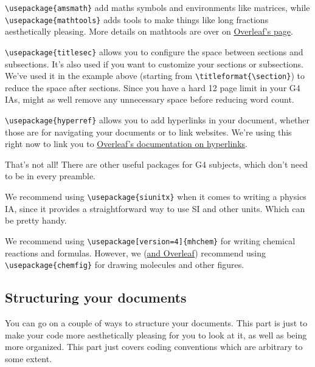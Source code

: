 \verb|\usepackage{amsmath}| add maths symbols and environments like matrices,
while\\ \verb|\usepackage{mathtools}| adds tools to make things like long fractions aesthetically pleasing.
More details on mathtools are over on
\href{https://www.overleaf.com/learn/latex/Articles/Mathtools_-_for_beautiful_math}{Overleaf's page}.

\verb|\usepackage{titlesec}| allows you to configure the space between sections and subsections.
It's also used if you want to customize your sections or subsections.
We've used it in the example above (starting from \verb|\titleformat{\section}|)
to reduce the space after sections.
Since you have a hard 12 page limit in your G4 IAs,
might as well remove any unnecessary space before reducing word count.

\verb|\usepackage{hyperref}| allows you to add hyperlinks in your document,
whether those are for navigating your documents or to link websites.
We're using this right now to link you to
\href{https://www.overleaf.com/learn/latex/Hyperlinks}{Overleaf's documentation on hyperlinks}.

That's not all! There are other useful packages for G4 subjects,
which don't need to be in every preamble.

We recommend using \verb|\usepackage{siunitx}| when it comes to writing a physics IA,
since it provides a straightforward way to use SI and other units.
Which can be pretty handy.

We recommend using \verb|\usepackage[version=4]{mhchem}| for writing chemical reactions and formulas.
However, we (\href{https://www.overleaf.com/learn/latex/Chemistry_formulae}{and Overleaf})
recommend using \verb|\usepackage{chemfig}| for drawing molecules and other figures.

\subsection{Structuring your documents}
You can go on a couple of ways to structure your documents.
This part is just to make your code more aesthetically pleasing for you to look at it,
as well as being more organized.
This part just covers coding conventions which are arbitrary to some extent.

